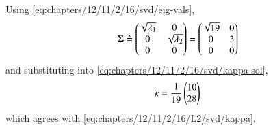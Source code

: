             Using \eqref{eq:chapters/12/11/2/16/svd/eig-vals},
    \begin{align}
        \mathbf{\Sigma} \triangleq \begin{pmatrix}\sqrt{\lambda_1}&0\\0&\sqrt{\lambda_2}\\0&0\end{pmatrix}
         = \begin{pmatrix}\sqrt{19}&0\\0&3\\0&0\end{pmatrix}
        \label{eq:chapters/12/11/2/16/svd/svd-params}
    \end{align}
    and substituting into 
	    \eqref{eq:chapters/12/11/2/16/svd/kappa-sol},
    \begin{align}
        \mathbf{\kappa} = \frac{1}{19}\begin{pmatrix}10\\28\end{pmatrix}
    \end{align}
    which agrees with 
\eqref{eq:chapters/12/11/2/16/L2/svd/kappa}.
